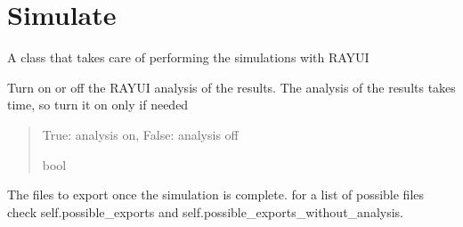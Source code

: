 \documentclass[letterpaper,10pt,english]{sphinxmanual}
\begin{document}
\section{Simulate}
\label{\detokenize{code_documentation:simulate}}

\begin{fulllineitems}
\label{\detokenize{code_documentation:raypyng.simulate.Simulate}}
\pysigstartsignatures
{}
\pysigstopsignatures
\sphinxAtStartPar
A class that takes care of performing the simulations with RAY\sphinxhyphen{}UI

\begin{fulllineitems}
\label{\detokenize{code_documentation:raypyng.simulate.Simulate.analyze}}
\pysigstartsignatures
{}
\pysigstopsignatures
\sphinxAtStartPar
Turn on or off the RAY\sphinxhyphen{}UI analysis of the results.
The analysis of the results takes time, so turn it on only if needed
\begin{quote}\begin{description}
\sphinxAtStartPar
True: analysis on, False: analysis off

\sphinxAtStartPar
bool

\end{description}\end{quote}

\end{fulllineitems}


\begin{fulllineitems}
\label{\detokenize{code_documentation:raypyng.simulate.Simulate.exports}}
\pysigstartsignatures
{}
\pysigstopsignatures
\sphinxAtStartPar
The files to export once the simulation is complete.
for a list of possible files check self.possible\_exports
and self.possible\_exports\_without\_analysis.


\end{fulllineitems}
\end{fulllineitems}
\end{document}
